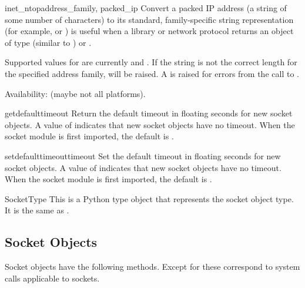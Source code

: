 \begin{funcdesc}{inet_ntop}{address_family, packed_ip}
Convert a packed IP address (a string of some number of characters) to
its standard, family-specific string representation (for example,
 or )
 is useful when a library or network protocol returns
an object of type  (similar to )
or .

Supported values for  are currently
 and .
If the string  is not the correct length for the
specified address family,  will be raised.  A
 is raised for errors from the call to
.

Availability: \UNIX{} (maybe not all platforms).
\end{funcdesc}

\begin{funcdesc}{getdefaulttimeout}{}
Return the default timeout in floating seconds for new socket objects.
A value of  indicates that new socket objects have no timeout.
When the socket module is first imported, the default is .
\end{funcdesc}

\begin{funcdesc}{setdefaulttimeout}{timeout}
Set the default timeout in floating seconds for new socket objects.
A value of  indicates that new socket objects have no timeout.
When the socket module is first imported, the default is .
\end{funcdesc}

\begin{datadesc}{SocketType}
This is a Python type object that represents the socket object type.
It is the same as .
\end{datadesc}


\begin{seealso}
\end{seealso}


\subsection{Socket Objects \label{socket-objects}}

Socket objects have the following methods.  Except for
 these correspond to \UNIX{} system calls
applicable to sockets.

